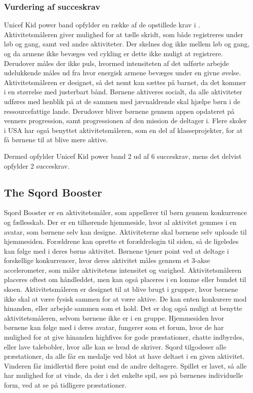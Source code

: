 \subsubsection{Vurdering af succeskrav}
Unicef Kid power band opfylder en række af de opstillede krav i . Aktivitetsmåleren giver mulighed for at tælle skridt, som både registreres under løb og gang, samt ved andre aktiviteter. Der skelnes dog ikke mellem løb og gang, og da armene ikke bevæges ved cykling er dette ikke muligt at registrere. Derudover måles der ikke puls, hvormed intensiteten af det udførte arbejde udelukkende måles ud fra hvor energisk armene bevæges under en givne øvelse. Aktivitetsmåleren er designet, så det nemt kan sættes på barnet, da det kommer i en størrelse med justerbart bånd.\citep{PowerManual2015} \newline
Børnene aktiveres socialt, da alle aktiviteter udføres med henblik på at de sammen med jævnaldrende skal hjælpe børn i de ressourcefattige lande. Derudover bliver børnene gennem appen opdateret på venners progression, samt progressionen af den mission de deltager i. Flere skoler i USA har også benyttet aktivitetsmåleren, som en del af klasseprojekter, for at få børnene til at blive mere aktive.\citep{PowerAbout2015}

Dermed opfylder Unicef Kid power band 2 ud af 6 succeskrav, mens det delvist opfylder 2 succeskrav.

\subsection{The Sqord Booster}
Sqord Booster er en aktivitetsmåler, som appellerer til børn gennem konkurrence og fællesskab. Der er en tilhørende hjemmeside, hvor al aktivitet gemmes i en avatar, som børnene selv kan designe. Aktiviteterne skal børnene selv uploade til hjemmesiden. Forældrene kan oprette et forældrelogin til siden, så de ligeledes kan følge med i deres børns aktivitet. Børnene tjener point ved at deltage i forskellige konkurrencer, hvor deres aktivitet måles gennem et 3-akse accelerometer, som måler aktivitetens intensitet og varighed. Aktivitetsmåleren placeres oftest om håndleddet, men kan også placeres i en lomme eller bundet til skoen. \newline
Aktivitetsmåleren er designet til at blive brugt i grupper, hvor børnene ikke skal at være fysisk sammen for at være aktive. De kan enten konkurere mod hinanden, eller arbejde sammen som et hold. Det er dog også muligt at benytte aktivitetsmåleren, selvom børnene ikke er i en gruppe. \noindent
Hjemmesiden hvor børnene kan følge med i deres avatar, fungerer som et forum, hvor de har mulighed for at give hinanden highfives for gode præstationer, chatte indbyrdes, eller lave talebobler, hvor alle kan se hvad de skriver. 
Sqord tilgodeser alle præstationer, da alle får en medalje ved blot at have deltaet i en given aktivitet. Vinderen får imidlertid flere point end de andre deltagere. Spillet er lavet, så alle har mulighed for at vinde, da der i det enkelte spil, ses på børnenes individuelle form, ved at se på tidligere præstationer.

